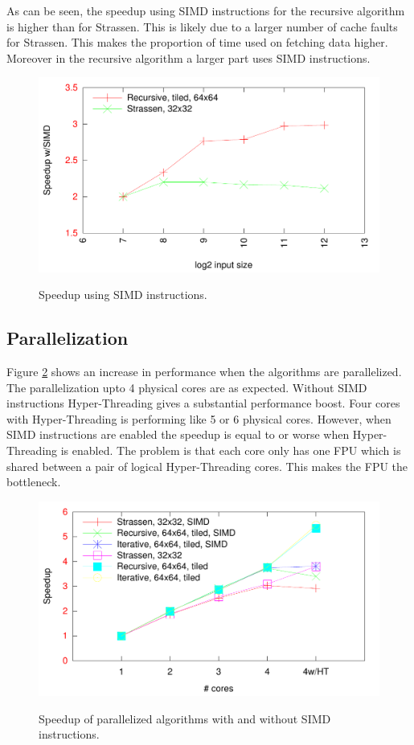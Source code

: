As can be seen, the speedup using SIMD instructions for the recursive algorithm is higher than for Strassen. This is likely due to a larger number of cache faults for Strassen. This makes the proportion of time used on fetching data higher. Moreover in the recursive algorithm a larger part uses SIMD instructions.

\begin{figure}[h!]
  \centering
  \includegraphics[width=\textwidth]{"../project2/gnuplots/simd_performance"}
  \label{fig:simd}
  \caption{Speedup using SIMD instructions.}
\end{figure}

\subsection{Parallelization}

Figure \ref{fig:parallel_speedup} shows an increase in performance when the algorithms are parallelized. The parallelization upto 4 physical cores are as expected. Without SIMD instructions Hyper-Threading gives a substantial performance boost. Four cores with Hyper-Threading is performing like 5 or 6 physical cores. However, when SIMD instructions are enabled the speedup is equal to or worse when Hyper-Threading is enabled. The problem is that each core only has one FPU \cite{IntelHT} which is shared between a pair of logical Hyper-Threading cores. This makes the FPU the bottleneck.

\begin{figure}[h!]
  \centering
  \includegraphics[width=\textwidth]{"../project2/gnuplots/parallel_speedup"}
  \label{fig:parallel_speedup}
  \caption{Speedup of parallelized algorithms with and without SIMD instructions.}
\end{figure}

